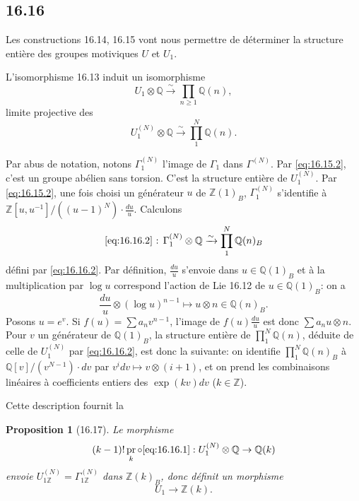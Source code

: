 \documentclass[12pt,a4paper]{article}
\theoremstyle{plain}
\newtheorem{proposition}[theorem]{Proposition}
\theoremstyle{definition}
\theoremstyle{remark}
\DeclareMathOperator{\pr}{pr}
\newcommand{\Betti}{B}
\newcommand{\ZZ}{\mathbb{Z}}
\newcommand{\QQ}{\mathbb{Q}}
\begin{document}
\subsection*{16.16}

Les constructions 16.14, 16.15 vont nous permettre de d\'eterminer la
structure enti\`ere des groupes motiviques $U$ et $U_1$.

L'isomorphisme 16.13 induit un isomorphisme
\begin{equation}\label{eq:16.16.1}
U_1 \otimes \QQ \xrightarrow{\sim} \prod_{n \geq 1} \QQ(n),
\end{equation}
limite projective des
\begin{equation}\label{eq:16.16.2}
U_1^{(N)} \otimes \QQ \xrightarrow{\sim} \prod_1^N \QQ(n).
\end{equation}

Par abus de notation, notons $\Gamma_1^{(N)}$ l'image de $\Gamma_1$ dans
$\Gamma^{(N)}$. Par \eqref{eq:16.15.2}, c'est un groupe ab\'elien sans
torsion. C'est la structure enti\`ere de $U_1^{(N)}$. Par
\eqref{eq:16.15.2}, une fois choisi un g\'en\'erateur $u$ de
$\ZZ(1)_\Betti$, $\Gamma_1^{(N)}$ s'identifie \`a
$\ZZ[u,u^{-1}]/((u-1)^N) \cdot \frac{du}{u}$. Calculons
\begin{equation}\label{eq:16.16.3}
\text{\eqref{eq:16.16.2} : } \Gamma_1^{(N)} \otimes \QQ \xrightarrow{\sim}
\prod_1^N \QQ(n)_\Betti
\end{equation}
d\'efini par \eqref{eq:16.16.2}. Par d\'efinition, $\frac{du}{u}$ s'envoie dans
$u \in \QQ(1)_\Betti$ et \`a la multiplication par $\log u$ correspond
l'action de Lie 16.12 de $u \in \QQ(1)_\Betti$: on a
\[
\frac{du}{u} \otimes (\log u)^{n-1} \longmapsto u \otimes n \in \QQ(n)_\Betti.
\]
Posons $u = e^v$. Si $f(u) = \sum a_n v^{n-1}$, l'image de
$f(u)\frac{du}{u}$ est donc $\sum a_n u \otimes n$. Pour $v$ un
 g\'en\'erateur de $\QQ(1)_\Betti$, la structure enti\`ere de
$\prod_1^N \QQ(n)$, d\'eduite de celle de $U_1^{(N)}$ par
\eqref{eq:16.16.2}, est donc la suivante: on identifie
$\prod_1^N \QQ(n)_\Betti$ \`a $\QQ[v]/(v^{N-1}) \cdot dv$ par
$v^i dv \mapsto v \otimes (i+1)$, et on prend les combinaisons lin\'eaires
\`a coefficients entiers des $\exp(kv)dv$ ($k \in \ZZ$).

Cette description fournit la

\begin{proposition}[16.17]\label{prop:16.17}
Le morphisme
\[
(k-1)! \pr_k \circ \text{\eqref{eq:16.16.1}} : U_1^{(N)} \otimes \QQ \to \QQ(k)
\]
envoie $U_{1\ZZ}^{(N)} = \Gamma_{1\ZZ}^{(N)}$ dans $\ZZ(k)_\Betti$, donc
d\'efinit un morphisme
\begin{equation}\label{eq:16.17.1}
U_1 \to \ZZ(k).
\end{equation}
\end{proposition}
\end{document}
